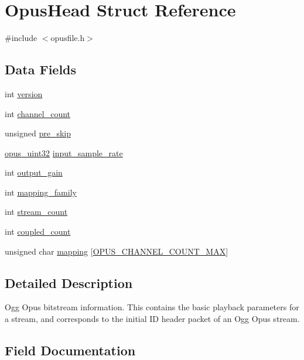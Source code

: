 \hypertarget{struct_opus_head}{}\section{Opus\+Head Struct Reference}
\label{struct_opus_head}


{\ttfamily \#include $<$opusfile.\+h$>$}

\subsection*{Data Fields}
\begin{DoxyCompactItemize}
\item 
int \hyperlink{struct_opus_head_a9b0e040fc6404ddc2b1fdbccf505f71e}{version}
\item 
int \hyperlink{struct_opus_head_ae3b3fc1a70e6b037c1d1d416fbdf2c8d}{channel\+\_\+count}
\item 
unsigned \hyperlink{struct_opus_head_ab448d3d3289d99f01dca8f19e878d57f}{pre\+\_\+skip}
\item 
\hyperlink{opus__types_8h_a643eaaadb9ef6cd44308e0299d8cd8ce}{opus\+\_\+uint32} \hyperlink{struct_opus_head_a73b80a913eca33d829f1667caee80d9e}{input\+\_\+sample\+\_\+rate}
\item 
int \hyperlink{struct_opus_head_a1f1c9e144ab05fe281f088d3e73eeab2}{output\+\_\+gain}
\item 
int \hyperlink{struct_opus_head_a338268b4264e059ae9ede890e6177304}{mapping\+\_\+family}
\item 
int \hyperlink{struct_opus_head_a241b040792d2181f3ff6fa7e9911ac40}{stream\+\_\+count}
\item 
int \hyperlink{struct_opus_head_a0b3e512ec24c989b0374358446197782}{coupled\+\_\+count}
\item 
unsigned char \hyperlink{struct_opus_head_ac6372a8a1729b034308bae47253d94b7}{mapping} \mbox{[}\hyperlink{group__header__info_gad6f0329582430a828244045ac85a5417}{O\+P\+U\+S\+\_\+\+C\+H\+A\+N\+N\+E\+L\+\_\+\+C\+O\+U\+N\+T\+\_\+\+M\+AX}\mbox{]}
\end{DoxyCompactItemize}


\subsection{Detailed Description}
Ogg Opus bitstream information. This contains the basic playback parameters for a stream, and corresponds to the initial ID header packet of an Ogg Opus stream. 

\subsection{Field Documentation}
\mbox{\label{struct_opus_head_ae3b3fc1a70e6b037c1d1d416fbdf2c8d}} 
